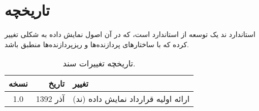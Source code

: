 
\section{تاریخچه}


استاندارد ند یک توسعه از استاندارد  است، که در آن اصول نمایش داده به
شکلی تغییر کرده که با ساختارهای پردازنده‌ها و ریزپردازنده‌ها منطبق باشد.

\begin{table}
\begin{centering}
\begin{tabular}{|c|r|p{5cm}|}\hline
	نسخه &
	تاریخ &
	تغییر\\\hline
	1.0 &
	آذر 1392 &
	ارائه اولیه قرارداد نمایش داده (ند)\\\hline
\end{tabular}
\label{introduction/history}
\caption[تاریخچه تغییرات سند]{
	تاریخچه تغییرات سند.
}
\end{centering}
\end{table}